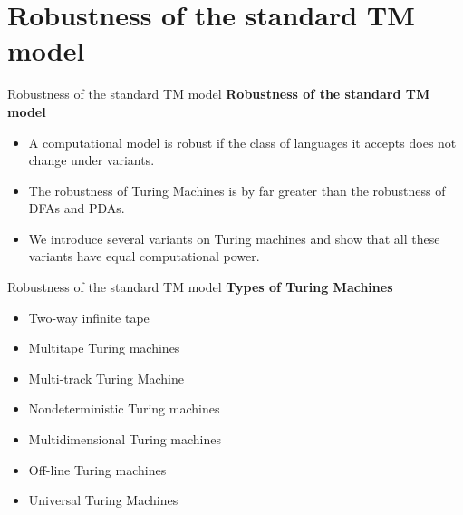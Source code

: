 \documentclass{beamer}
\begin{document}
\section{Robustness of the standard TM model}
\begin{frame}{Robustness of the standard TM model}
\textbf{Robustness of the standard TM model}
\begin{itemize}
	\item A computational model is robust if the class of languages it
	accepts does not change under variants.
	\item The robustness of Turing Machines is by far greater than
	the robustness of DFAs and PDAs.

	\item We introduce several variants on Turing machines and show
	that all these variants have equal computational power.

\end{itemize}
\end{frame}
\begin{frame}{Robustness of the standard TM model}
	\textbf{Types of Turing Machines}
	\begin{itemize}
		\item Two-way infinite tape
		\item Multitape Turing machines
		\item Multi-track Turing Machine
		\item Nondeterministic Turing machines
		\item Multidimensional Turing machines
		\item Off-line Turing machines
		\item Universal Turing Machines
	\end{itemize}
\end{frame}
\end{document}

